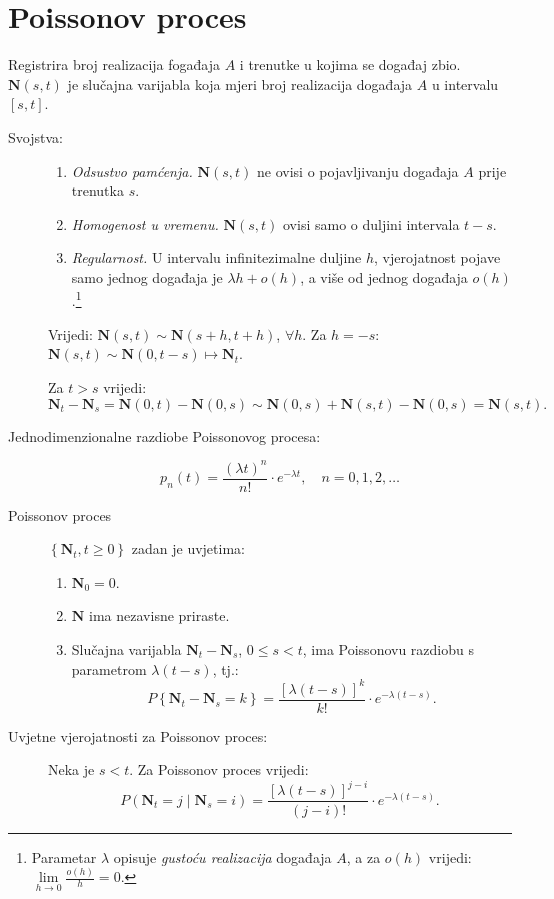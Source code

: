 \documentclass[12pt,english]{article}
\newcommand{\N}{\mathbf N}
\begin{document}
\section{Poissonov proces}
Registrira broj realizacija fogađaja $A$ i trenutke u kojima se događaj zbio.
$\mathbf N(s,t)$ je slučajna varijabla koja mjeri broj realizacija događaja $A$ u intervalu $[s,t]$.

\begin{description}
  \item[Svojstva:]\hfill
    \begin{enumerate}
      \item \emph{Odsustvo pamćenja.} $\mathbf N(s,t)$ ne ovisi o pojavljivanju događaja $A$ prije trenutka $s$.
      \item \emph{Homogenost u vremenu.} $\mathbf N(s,t)$ ovisi samo o duljini intervala $t-s$.
      \item \emph{Regularnost.} U intervalu infinitezimalne duljine $h$, vjerojatnost pojave samo jednog događaja je $\lambda h + o(h)$, a više od jednog događaja $o(h)$.\footnote{Parametar $\lambda$ opisuje \emph{gustoću realizacija} događaja $A$, a za $o(h)$ vrijedi: $\lim\limits_{h\rightarrow 0} \frac{o(h)}{h} = 0$.}
    \end{enumerate}
  Vrijedi: $\mathbf N(s,t) \sim \mathbf N(s+h,t+h)$, $\forall h$. Za $h=-s$: $\mathbf N(s,t) \sim \mathbf N(0,t-s) \mapsto \mathbf N_t$.

  Za $t>s$ vrijedi:
  $\N_t - \N_s = \N(0,t) - \N(0,s) \sim \N(0,s)+\N(s,t)-\N(0,s) = \N(s,t).$

  \item[Jednodimenzionalne razdiobe Poissonovog procesa:]
  $$p_n(t) = \frac{(\lambda t)^n}{n!}\cdot e^{-\lambda t}, \quad n = 0,1,2,\ldots$$
  \item[Poissonov proces] $\left\{ \N_t, t \geq 0\right\}$ zadan je uvjetima:
  \begin{enumerate}
    \item $\N_0 = 0$.
    \item $\N$ ima nezavisne priraste.
    \item Slučajna varijabla $\N_t-\N_s$, $0 \leq s < t$, ima Poissonovu razdiobu s parametrom $\lambda(t-s)$, tj.:
    $$P\left\{\N_t-\N_s = k\right\} = \frac{\left[ \lambda(t-s)\right]^k}{k!}\cdot e^{-\lambda (t-s)}.$$
  \end{enumerate}

  \item[Uvjetne vjerojatnosti za Poissonov proces:] Neka je $s<t$. Za Poissonov proces vrijedi:
  $$P(\N_t = j\; \vert \; \N_s = i) = \frac{\left[\lambda(t-s)\right]^{j-i}}{(j-i)!}\cdot e^{-\lambda(t-s)}.$$


\end{description}
\end{document}
